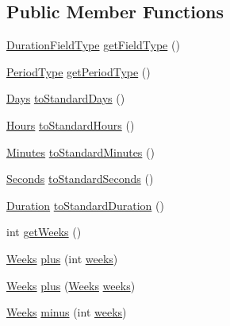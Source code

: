 \subsection*{Public Member Functions}
\begin{DoxyCompactItemize}
\item 
\hyperlink{classorg_1_1joda_1_1time_1_1_duration_field_type}{Duration\-Field\-Type} \hyperlink{classorg_1_1joda_1_1time_1_1_weeks_ab0f773bc97824a354c81baaba8e7912f}{get\-Field\-Type} ()
\item 
\hyperlink{classorg_1_1joda_1_1time_1_1_period_type}{Period\-Type} \hyperlink{classorg_1_1joda_1_1time_1_1_weeks_a52084312299aca7d652354824048b70f}{get\-Period\-Type} ()
\item 
\hyperlink{classorg_1_1joda_1_1time_1_1_days}{Days} \hyperlink{classorg_1_1joda_1_1time_1_1_weeks_a61a7ff7817b6fe2e2dd7920c587b152b}{to\-Standard\-Days} ()
\item 
\hyperlink{classorg_1_1joda_1_1time_1_1_hours}{Hours} \hyperlink{classorg_1_1joda_1_1time_1_1_weeks_a1c05e71fb9778677c19c77c576c33cde}{to\-Standard\-Hours} ()
\item 
\hyperlink{classorg_1_1joda_1_1time_1_1_minutes}{Minutes} \hyperlink{classorg_1_1joda_1_1time_1_1_weeks_a6023041b24acb1558d60a74bfaba0af8}{to\-Standard\-Minutes} ()
\item 
\hyperlink{classorg_1_1joda_1_1time_1_1_seconds}{Seconds} \hyperlink{classorg_1_1joda_1_1time_1_1_weeks_ad11f12c42d819527d7083a963515c310}{to\-Standard\-Seconds} ()
\item 
\hyperlink{classorg_1_1joda_1_1time_1_1_duration}{Duration} \hyperlink{classorg_1_1joda_1_1time_1_1_weeks_a765f36f5f596b4b395101fbb6083dcaa}{to\-Standard\-Duration} ()
\item 
int \hyperlink{classorg_1_1joda_1_1time_1_1_weeks_afdc6e7057be963a78ebdc2d15cad7c99}{get\-Weeks} ()
\item 
\hyperlink{classorg_1_1joda_1_1time_1_1_weeks}{Weeks} \hyperlink{classorg_1_1joda_1_1time_1_1_weeks_af8415b6d3f723f4601a5cf1aa5ca0ce7}{plus} (int \hyperlink{classorg_1_1joda_1_1time_1_1_weeks_a3400c36b657baaf1c64630ab8a8c5389}{weeks})
\item 
\hyperlink{classorg_1_1joda_1_1time_1_1_weeks}{Weeks} \hyperlink{classorg_1_1joda_1_1time_1_1_weeks_a0c4e635ef918b7bb025a85c7b2c1cc19}{plus} (\hyperlink{classorg_1_1joda_1_1time_1_1_weeks}{Weeks} \hyperlink{classorg_1_1joda_1_1time_1_1_weeks_a3400c36b657baaf1c64630ab8a8c5389}{weeks})
\item 
\hyperlink{classorg_1_1joda_1_1time_1_1_weeks}{Weeks} \hyperlink{classorg_1_1joda_1_1time_1_1_weeks_ae8b1cfd9b509abc444ccee5f98ff21a0}{minus} (int \hyperlink{classorg_1_1joda_1_1time_1_1_weeks_a3400c36b657baaf1c64630ab8a8c5389}{weeks})

\end{DoxyCompactItemize}
